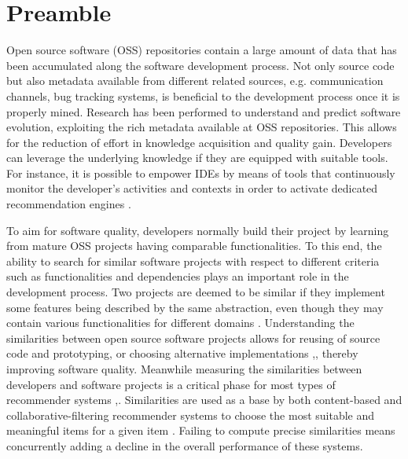 

\section{Preamble}
Open source software (OSS) repositories contain a large amount of data that has been accumulated along the software development process. Not only source code but also metadata available from different related sources, e.g. communication channels, bug tracking systems, is beneficial to the development process once it is properly mined. Research has been performed to understand and predict software evolution, exploiting the rich metadata available at OSS repositories. This allows for the reduction of effort in knowledge acquisition and quality gain. Developers can leverage the underlying knowledge if they are equipped with suitable tools. For instance, it is possible to empower IDEs by means of tools that continuously monitor the developer's activities and contexts in order to activate dedicated recommendation engines \cite{Ponzanelli:2014:MST:2597073.2597077}. 


To aim for software quality, developers normally build their project by learning from mature OSS projects having comparable functionalities. To this end, the ability to search for similar software projects with respect to different criteria such as functionalities and dependencies plays an important role in the development process. Two projects are deemed to be similar if they implement some features being described by the same abstraction, even though they may contain various functionalities for different domains \cite{McMillan:2012:DSS:2337223.2337267}. Understanding the similarities between open source software projects allows for reusing of source code and prototyping, or choosing alternative implementations \cite{Schafer:2007:CFR:1768197.1768208},\cite{10.1109/SANER.2017.7884605}, thereby improving software quality. Meanwhile measuring the similarities between developers and software projects is a critical phase for most types of recommender systems \cite{DBLP:conf/rweb/NoiaO15},\cite{Sarwar:2001:ICF:371920.372071}. Similarities are used as a base by both content-based and collaborative-filtering recommender systems to choose the most suitable and meaningful items for a given item \cite{Schafer:2007:CFR:1768197.1768208}. Failing to compute precise similarities means concurrently adding a decline in the overall performance of these systems.

